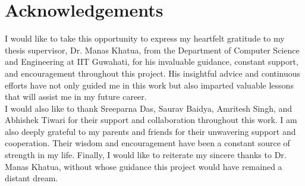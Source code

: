 \chapter*{\centering Acknowledgements}
\quad I would like to take this opportunity to express my heartfelt gratitude to my thesis supervisor, Dr. Manas Khatua, from the Department of Computer Science and Engineering at IIT Guwahati, for his invaluable guidance, constant support, and encouragement throughout this project. His insightful advice and continuous efforts have not only guided me in this work but also imparted valuable lessons that will assist me in my future career.\\

I would also like to thank Sreeparna Das, Saurav Baidya, Amritesh Singh, and Abhishek Tiwari for their support and collaboration throughout this work. I am also deeply grateful to my parents and friends for their unwavering support and cooperation. Their wisdom and encouragement have been a constant source of strength in my life. Finally, I would like to reiterate my sincere thanks to Dr. Manas Khatua, without whose guidance this project would have remained a distant dream.
